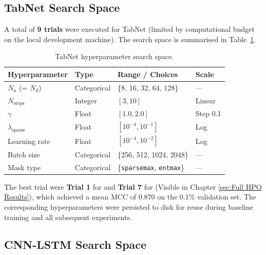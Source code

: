 \documentclass[../main.tex]{subfiles}
\begin{document}
\newpage
\subsection{TabNet Search Space}
\label{sec:hpo-tabnet}

A total of \textbf{9 trials} were executed for TabNet (limited by computational budget on the local development machine). The search space is summarised in Table~\ref{tab:hpo-tabnet-space}.

\begin{table}[H]
\centering
\caption{TabNet hyperparameter search space.}
\label{tab:hpo-tabnet-space}
\small
\begin{tabular}{llll}
\toprule
\textbf{Hyperparameter} & \textbf{Type}      & \textbf{Range / Choices} & \textbf{Scale} \\
\midrule
$N_a$ (= $N_d$)         & Categorical        & \{8, 16, 32, 64, 128\}   & —              \\
$N_{\text{steps}}$      & Integer            & $[3, 10]$                & Linear         \\
$\gamma$                & Float              & $[1.0, 2.0]$             & Step 0.1       \\
$\lambda_{\text{sparse}}$ & Float            & $[10^{-4}, 10^{-1}]$     & Log            \\
Learning rate           & Float              & $[10^{-4}, 10^{-2}]$     & Log            \\
Batch size              & Categorical        & \{256, 512, 1024, 2048\} & —              \\
Mask type               & Categorical        & \{\texttt{sparsemax}, \texttt{entmax}\} & — \\
\bottomrule
\end{tabular}
\end{table}

The best trial were \textbf{Trial 1} for  and \textbf{Trial 7} for  (Visible in Chapter \ref{sec:Full HPO Results}), which achieved a mean MCC of $0.870$ on the 0.1\% validation set.  The corresponding hyperparameters were persisted to disk for reuse during baseline training and all subsequent experiments.

\subsection{CNN-LSTM Search Space}
\label{sec:hpo-cnnlstm}
\end{document}
